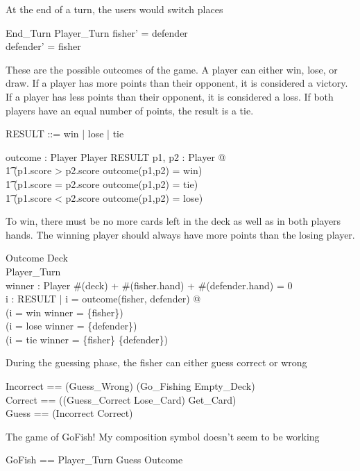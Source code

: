 \documentclass{article}
\begin{document}
At the end of a turn, the users would switch places
\begin{schema}{End\_Turn}
    \Delta Player\_Turn
    \where
    fisher' = defender \\
    defender' = fisher
\end{schema}
\clearpage
These are the possible outcomes of the game. A player can
either win, lose, or draw. If a player has more points than their
opponent, it is considered a victory. If a player has less points
than their opponent, it is considered a loss. If both players have
an equal number of points, the result is a tie.
\begin{zed}
    RESULT ::= win | lose | tie
\end{zed}

\begin{axdef}
    outcome : Player \cross Player \fun RESULT
    \where
    \forall p1, p2 : Player @\\
    \t1 (p1.score > p2.score \land outcome(p1,p2) = win) \lor \\
    \t1 (p1.score = p2.score \land outcome(p1,p2) = tie) \lor \\
    \t1 (p1.score < p2.score \land outcome(p1,p2) = lose)
\end{axdef}

To win, there must be no more cards left in the deck as well as
in both players hands. The winning player should always have more
points than the losing player.
\begin{schema}{Outcome}
    Deck \\
    Player\_Turn\\
    winner : \power Player
    \where
    \#(deck) + \#(fisher.hand) + \#(defender.hand) = 0 \\
    \forall i : RESULT | i = outcome(fisher, defender) @\\
    (i = win \land winner = \{fisher\}) \lor \\
    (i = lose \land winner = \{defender\}) \lor \\
    (i = tie \land winner = \{fisher\} \cup \{defender\})
\end{schema}

During the guessing phase, the fisher can either guess correct or wrong
\begin{zed}
    Incorrect == (Guess\_Wrong) \land (Go\_Fishing \lor Empty\_Deck)\\
    Correct == ((Guess\_Correct \pipe Lose\_Card) \pipe Get\_Card) \\
    Guess == (Incorrect \lor Correct)
\end{zed}

The game of GoFish! My composition symbol doesn't seem to be working
\begin{zed}
    GoFish == Player\_Turn \semi Guess \semi Outcome\\
\end{zed}
    
\end{document}
